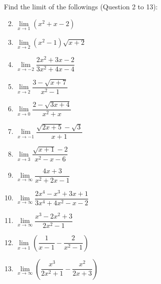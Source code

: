 \documentclass[12pt]{report}
\begin{document}
\setlength{\columnseprule}{1pt}
\setlength{\columnsep}{24pt}
\begin{multicols}{2}
    \noindent Find the limit of the followings (Question 2 to 13):
    \begin{enumerate}
        \setcounter{enumi}{1}
        \item $\lim\limits_{x\to1}\left(x^{2}+x-2\right)$
        \item $\lim\limits_{x\to2}\left(x^{2}-1\right){\sqrt{x+2}}$
        \item $\lim\limits_{x\to-2}{\dfrac{2x^{2}+3x-2}{3x^{2}+4x-4}}$
        \item $\lim\limits_{x\to2}{\dfrac{3-{\sqrt{x+7}}}{x^{2}-1}}$
        \item $\lim\limits_{x\to0}{\dfrac{2-{\sqrt{3x+4}}}{x^{2}+x}}$
        \item $\lim\limits_{x\to-1}{\dfrac{{\sqrt{2x+5}}-{\sqrt{3}}}{x+1}}$
        \item $\lim\limits_{x\to3}{\dfrac{{\sqrt{x+1}}-2}{x^{2}-x-6}}$
        \item $\lim\limits_{x\to\infty}{\dfrac{4x+3}{x^{2}+2x-1}}$
        \item $\lim\limits_{x\to\infty}{\dfrac{2x^{4}-x^{3}+3x+1}{3x^{4}+4x^{2}-x-2}}$
        \item $\lim\limits_{x\to\infty}{\dfrac{x^{3}-2x^{2}+3}{2x^{2}-1}}$
        \item $\lim\limits_{x\to1}\left({\dfrac{1}{x-1}}-{\dfrac{2}{x^{2}-1}}\right)$
        \item $\lim\limits_{x\to\infty}\left(\dfrac{x^{3}}{2x^{2}+1}-\dfrac{x^{2}}{2x+3}\right)$
    \end{enumerate}


\end{multicols}
\end{document}
